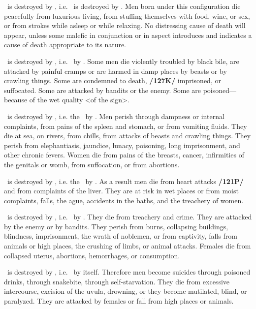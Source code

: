 \Taurus\, \mn{\Taurus} is destroyed by \Sagittarius, i.e. \Venus\, is destroyed by \Jupiter. Men born under this configuration die peacefully from luxurious living, from stuffing themselves with food, wine, or sex, or from strokes while asleep or while relaxing. No distressing cause of death will appear, unless some malefic in conjunction or in aspect introduces and indicates a cause of death appropriate to its nature.

\Gemini\, \mn{\Gemini} is destroyed by \Capricorn, i.e. \Mercury\, by \Saturn. Some men die violently troubled by black bile, are attacked by painful cramps or are harmed in damp places by beasts or by crawling things. Some are condemned to death, \textbf{/127K/} imprisoned, or suffocated. Some are attacked by bandits or the enemy. Some are poisoned—because of the wet quality <of the sign>.

\Cancer\, \mn{\Cancer} is destroyed by \Aquarius, i.e. the \Moon\, by \Saturn. Men perish through dampness or internal complaints, from pains of the spleen and stomach, or from vomiting fluids. They die at sea, on rivers, from chills, from attacks of beasts and crawling things. They perish from elephantiasis, jaundice, lunacy, poisoning, long imprisonment, and other chronic fevers. Women die from pains of the breasts, cancer, infirmities of the genitals or womb, from suffocation, or from abortions.

\Leo\, \mn{\Leo} is destroyed by \Pisces, i.e. the \Sun\, by \Jupiter. As a result men die from heart attacks \textbf{/121P/} and from complaints of the liver. They are at risk in wet places or from moist complaints, falls, the ague, accidents in the baths, and the treachery of women.

\Virgo\, \mn{\Virgo} is destroyed by \Aries, i.e. \Mercury\, by \Mars. They die from treachery and crime. They are attacked by the enemy or by bandits. They perish from burns, collapsing buildings, blindness, imprisonment, the wrath of noblemen, or from captivity, falls from animals or high places, the crushing of limbs, or animal attacks. Females die from collapsed uterus, abortions, hemorrhages, or consumption.

\Libra\, is destroyed by \Taurus, i.e. \Venus\, by itself. Therefore men become suicides through poisoned drinks, through snakebite, through self-starvation. They die from excessive intercourse, excision of the uvula, drowning, or they become mutilated, blind, or paralyzed. They are attacked by females or fall from high places or animals.

